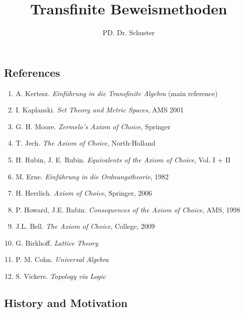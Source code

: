 \documentclass[headsepline=true,DIV=11]{scrartcl}
\theoremstyle{definition}
\newenvironment{gelaber}{}{}
\newenvironment{preamble}{}{}
\begin{document}
\begin{preamble}
\subject{Vorlesung aus dem Sommersemester 2013}
\title{Transfinite Beweismethoden}
\author{PD. Dr. Schuster}
\date{}

\maketitle
\end{preamble}

\setcounter{section}{0}


\subsection*{References}

\begin{gelaber}
	\begin{enumerate}
		\item A. Kertesz. {\em Einführung in die Transfinite Algebra} (main reference)
		\item I. Kaplanski. {\em Set Theory and Metric Spaces}, AMS 2001
		\item G. H. Moore. {\em Zermelo's Axiom of Choice}, Springer
		\item T. Jech. {\em The Axiom of Choice}, North-Holland
		\item H. Rubin, J. E. Rubin. {\em Equivalents of the Axiom of Choice},  Vol. I + II
		\item M. Erne. {\em Einführung in die Ordnungstheorie}, 1982
		\item H. Herrlich. {\em Axiom of Choice}, Springer, 2006
		\item P. Howard, J.E. Rubin. {\em Consequences of the Axiom of Choice}, AMS, 1998
		\item J.L. Bell. {\em The Axiom of Choice}, College, 2009
                \item G. Birkhoff. {\em Lattice Theory}
                \item P. M. Cohn. {\em Universal Algebra}
                \item S. Vickers. {\em Topology via Logic}
	\end{enumerate}
\end{gelaber}

\subsection*{History and Motivation}
\end{document}
